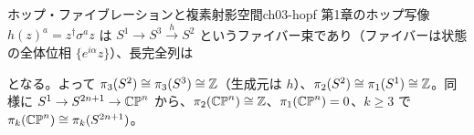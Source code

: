 \begin{myex}{ホップ・ファイブレーションと複素射影空間}{ch03-hopf}
第1章のホップ写像 $h(z)^a=z^\dagger\sigma^az$ は $S^1\to S^3\xrightarrow{h}S^2$ というファイバー束であり（ファイバーは状態の全体位相 $\{e^{i\alpha}z\}$）、長完全列は
\begin{center}
\end{center}
となる。よって $\pi_3(S^2)\cong\pi_3(S^3)\cong\mathbb{Z}$（生成元は $h$）、$\pi_2(S^2)\cong\pi_1(S^1)\cong\mathbb{Z}$。同様に $S^1\to S^{2n+1}\to\mathbb{CP}^n$ から、$\pi_2(\mathbb{CP}^n)\cong\mathbb{Z}$、$\pi_1(\mathbb{CP}^n)=0$、$k\ge3$ で $\pi_k(\mathbb{CP}^n)\cong\pi_k(S^{2n+1})$。
\end{myex}

